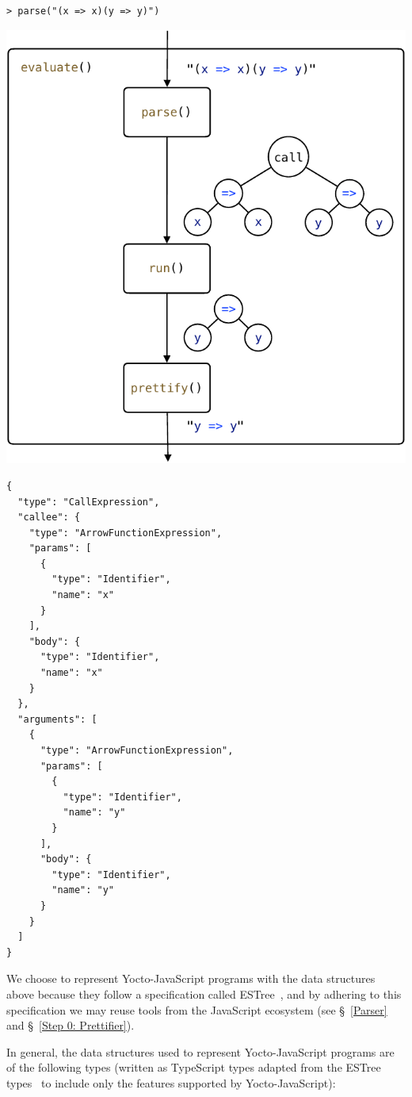 \documentclass[12pt, oneside]{book}
\begin{document}
\begin{verbatim}
> parse("(x => x)(y => y)")
\end{verbatim}
\includegraphics[page = 3]{images.pdf}
\begin{verbatim}
{
  "type": "CallExpression",
  "callee": {
    "type": "ArrowFunctionExpression",
    "params": [
      {
        "type": "Identifier",
        "name": "x"
      }
    ],
    "body": {
      "type": "Identifier",
      "name": "x"
    }
  },
  "arguments": [
    {
      "type": "ArrowFunctionExpression",
      "params": [
        {
          "type": "Identifier",
          "name": "y"
        }
      ],
      "body": {
        "type": "Identifier",
        "name": "y"
      }
    }
  ]
}
\end{verbatim}

We choose to represent Yocto-JavaScript programs with the data structures above because they follow a specification called ESTree~\cite{estree}, and by adhering to this specification we may reuse tools from the JavaScript ecosystem (see §~\ref{Parser} and §~\ref{Step 0: Prettifier}).

In general, the data structures used to represent Yocto-JavaScript programs are of the following types (written as TypeScript types adapted from the ESTree types~\cite{estree-types} to include only the features supported by Yocto-JavaScript):
\end{document}
